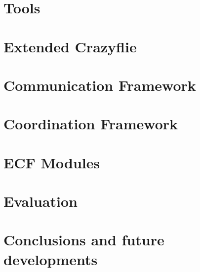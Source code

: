 \documentclass{Configuration_Files/PoliMi3i_thesis}
\begin{document}
\chapter{Tools}
\label{ch:tools}


\chapter{Extended Crazyflie}
\label{ch:ecf}


\chapter{Communication Framework}
\label{ch:communication}


\chapter{Coordination Framework}
\label{ch:coordination}


\chapter{ECF Modules}
\label{ch:modules}


\chapter{Evaluation}
\label{ch:evaluation}


\chapter{Conclusions and future developments}
\label{ch:conclusions}




\end{document}
